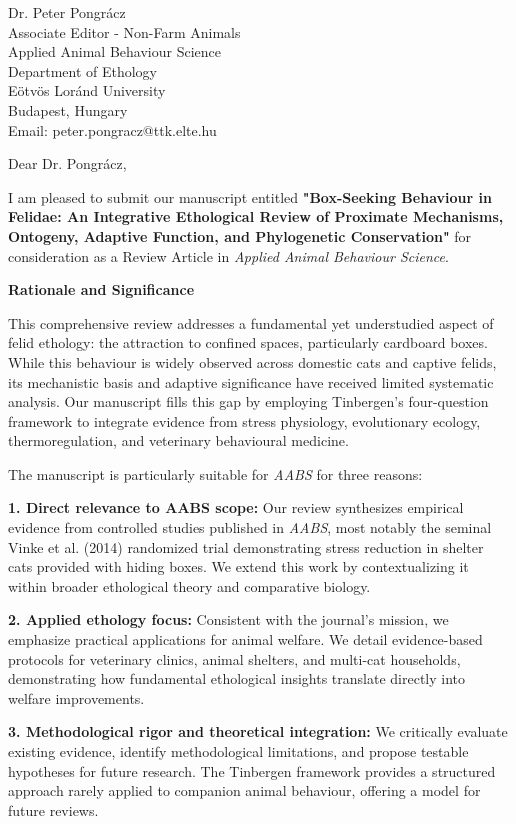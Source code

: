 \documentclass[11pt]{letter}
\begin{document}
\begin{letter}{
Dr. Peter Pongrácz\\
Associate Editor - Non-Farm Animals\\
Applied Animal Behaviour Science\\
Department of Ethology\\
Eötvös Loránd University\\
Budapest, Hungary\\
Email: peter.pongracz@ttk.elte.hu
}

\opening{Dear Dr. Pongrácz,}

I am pleased to submit our manuscript entitled \textbf{"Box-Seeking Behaviour in Felidae: An Integrative Ethological Review of Proximate Mechanisms, Ontogeny, Adaptive Function, and Phylogenetic Conservation"} for consideration as a Review Article in \textit{Applied Animal Behaviour Science}.

\textbf{Rationale and Significance}

This comprehensive review addresses a fundamental yet understudied aspect of felid ethology: the attraction to confined spaces, particularly cardboard boxes. While this behaviour is widely observed across domestic cats and captive felids, its mechanistic basis and adaptive significance have received limited systematic analysis. Our manuscript fills this gap by employing Tinbergen's four-question framework to integrate evidence from stress physiology, evolutionary ecology, thermoregulation, and veterinary behavioural medicine.

The manuscript is particularly suitable for \textit{AABS} for three reasons:

\textbf{1. Direct relevance to AABS scope:} Our review synthesizes empirical evidence from controlled studies published in \textit{AABS}, most notably the seminal Vinke et al. (2014) randomized trial demonstrating stress reduction in shelter cats provided with hiding boxes. We extend this work by contextualizing it within broader ethological theory and comparative biology.

\textbf{2. Applied ethology focus:} Consistent with the journal's mission, we emphasize practical applications for animal welfare. We detail evidence-based protocols for veterinary clinics, animal shelters, and multi-cat households, demonstrating how fundamental ethological insights translate directly into welfare improvements.

\textbf{3. Methodological rigor and theoretical integration:} We critically evaluate existing evidence, identify methodological limitations, and propose testable hypotheses for future research. The Tinbergen framework provides a structured approach rarely applied to companion animal behaviour, offering a model for future reviews.


\end{letter}
\end{document}
